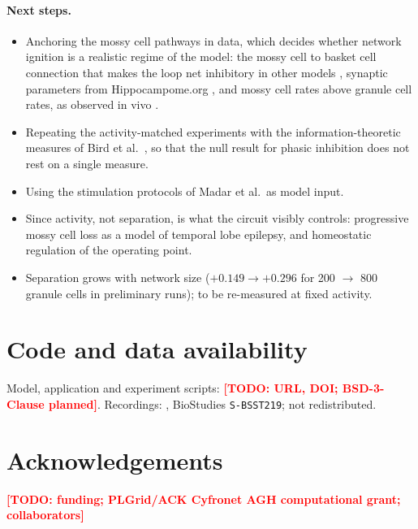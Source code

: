 \documentclass[11pt,a4paper]{article}
\newcommand{\todo}[1]{\textcolor{red}{\textbf{[TODO: #1]}}}
\begin{document}
\paragraph{Next steps.}
\begin{itemize}
  \item Anchoring the mossy cell pathways in data, which decides whether network
        ignition is a realistic regime of the model: the mossy cell to basket
        cell connection that makes the loop net inhibitory in other models
        \cite{chavlis2017,danielson2017,jinde2012}, synaptic parameters from
        Hippocampome.org \cite{wheeler2024}, and mossy cell rates above granule
        cell rates, as observed in vivo \cite{danielson2017}.
  \item Repeating the activity-matched experiments with the information-theoretic
        measures of Bird et al.\ \cite{bird2024}, so that the null result for
        phasic inhibition does not rest on a single measure.
  \item Using the stimulation protocols of Madar et al.\ as model input.
  \item Since activity, not separation, is what the circuit visibly controls:
        progressive mossy cell loss as a model of temporal lobe epilepsy, and
        homeostatic regulation of the operating point.
  \item Separation grows with network size ($+0.149 \to +0.296$ for 200 $\to$ 800
        granule cells in preliminary runs); to be re-measured at fixed activity.
\end{itemize}

\section*{Code and data availability}

Model, application and experiment scripts: \todo{URL, DOI; BSD-3-Clause planned}.
Recordings: \cite{madar2019}, BioStudies \texttt{S-BSST219}; not redistributed.

\section*{Acknowledgements}
\todo{funding; PLGrid/ACK Cyfronet AGH computational grant; collaborators}
\end{document}
